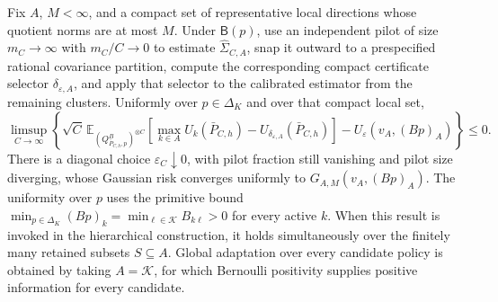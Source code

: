 Fix \(A\), \(M<\infty\), and a compact set of representative local directions whose quotient norms are at most \(M\).  Under \(\mathsf B(p)\), use an independent pilot of size \(m_C\to\infty\) with \(m_C/C\to0\) to estimate \(\widehat\Sigma_{C,A}\), snap it outward to a prespecified rational covariance partition, compute the corresponding compact certificate selector \(\delta_{\varepsilon,A}\), and apply that selector to the calibrated estimator from the remaining clusters.  Uniformly over \(p\in\Delta_K\) and over that compact local set,
\[
\limsup_{C\to\infty}\left\{\sqrt C\,\mathbb E_{(Q^B_{\bar P_{C,h},p})^{\otimes C}}
\left[\max_{k\in A}U_k(\bar P_{C,h})-U_{\delta_{\varepsilon,A}}(\bar P_{C,h})\right]
-U_\varepsilon(v_A,(Bp)_A)\right\}\leq0.
\]
There is a diagonal choice \(\varepsilon_C\downarrow0\), with pilot fraction still vanishing and pilot size diverging, whose Gaussian risk converges uniformly to \(G_{A,M}(v_A,(Bp)_A)\).  The uniformity over \(p\) uses the primitive bound \(\min_{p\in\Delta_K}(Bp)_k=\min_{\ell\in\mathcal K}B_{k\ell}>0\) for every active \(k\).  When this result is invoked in the hierarchical construction, it holds simultaneously over the finitely many retained subsets \(S\subseteq A\).  Global adaptation over every candidate policy is obtained by taking \(A=\mathcal K\), for which Bernoulli positivity supplies positive information for every candidate.